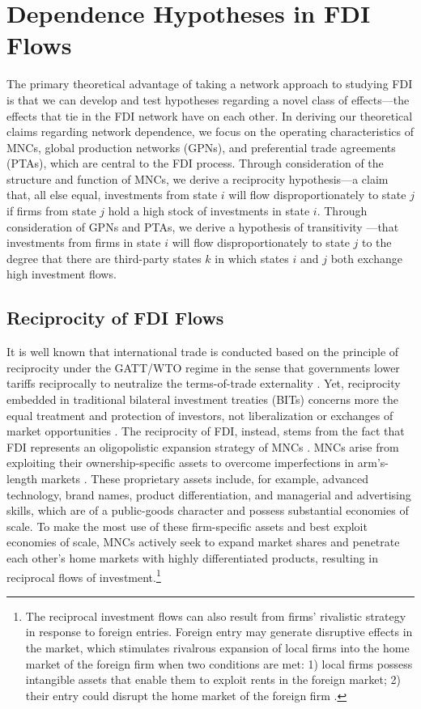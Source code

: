 \documentclass[reqno,onecolumn,letterpaper,12pt]{article}
\begin{document}
\section{Dependence Hypotheses in FDI Flows}

The primary theoretical advantage of taking a network approach to studying FDI is that we can develop and test hypotheses regarding a novel class of effects---the effects that tie in the FDI network have on each other. In deriving our theoretical claims regarding network dependence, we focus on the operating characteristics of MNCs, global production networks (GPNs), and preferential trade agreements (PTAs), which are central to the FDI process. Through consideration of the structure and function of MNCs, we derive a reciprocity \citep{garlaschelli2004patterns} hypothesis---a claim that, all else equal, investments from state $i$ will flow disproportionately to state $j$ if firms from state $j$ hold a high stock of investments in state $i$. Through consideration of GPNs and PTAs, we derive a hypothesis of transitivity \citep{holland1971transitivity}---that investments from firms in state $i$ will flow disproportionately to state $j$ to the degree that there are third-party states $k$ in which states $i$ and $j$ both exchange high investment flows.

\subsection{Reciprocity of FDI Flows}
It is well known that international trade is conducted based on the principle of reciprocity under the GATT/WTO regime in the sense that governments lower tariffs reciprocally to neutralize the terms-of-trade externality \citep{Bagwell_Staiger:1999}. Yet, reciprocity embedded in traditional bilateral investment treaties (BITs) concerns more the equal treatment and protection of investors, not liberalization or exchanges of market opportunities \citep[~56]{DiMascio_Pauwelyn:2008}. The reciprocity of FDI, instead, stems from the fact that FDI represents an oligopolistic expansion strategy of MNCs \citep{Hymer:1976,Kindleberger:1969}. MNCs arise from exploiting their ownership-specific assets to overcome imperfections in arm's-length markets \citep{Caves:1996,Dunning:1992}. These proprietary assets include, for example, advanced technology, brand names, product differentiation, and managerial and advertising skills, which are of a public-goods character and possess substantial economies of scale. To make the most use of these firm-specific assets and best exploit economies of scale, MNCs actively seek to expand market shares and penetrate each other's home markets with highly differentiated products, resulting in reciprocal flows of investment.\footnote{The reciprocal investment flows can also result from firms' rivalistic strategy in response to foreign entries. Foreign entry may generate disruptive effects in the market, which stimulates rivalrous expansion of local firms into the home market of the foreign firm when two conditions are met: 1) local firms possess intangible assets that enable them to exploit rents in the foreign market; 2) their entry could disrupt the home market of the foreign firm \citep{Graham:1978}. }
\end{document}
